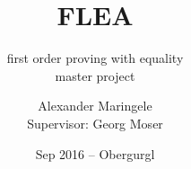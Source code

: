 
\author[Alexander Maringele]{Alexander Maringele\\ {Supervisor: Georg Moser}}
\title{\textbf{FLEA}}
\subtitle{first order proving with equality\\master project\\}
\date{Sep 2016 -- Obergurgl}